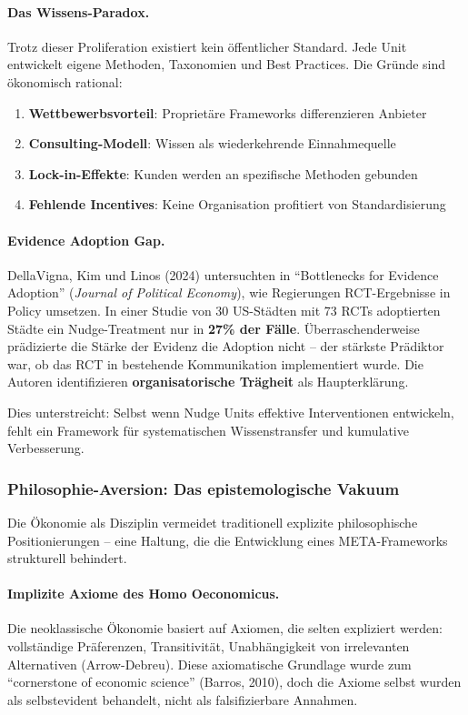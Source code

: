 \paragraph{Das Wissens-Paradox.}
Trotz dieser Proliferation existiert kein öffentlicher Standard. Jede Unit entwickelt eigene Methoden, Taxonomien und Best Practices. Die Gründe sind ökonomisch rational:

\begin{enumerate}[label=(\arabic*)]
    \item \textbf{Wettbewerbsvorteil}: Proprietäre Frameworks differenzieren Anbieter
    \item \textbf{Consulting-Modell}: Wissen als wiederkehrende Einnahmequelle
    \item \textbf{Lock-in-Effekte}: Kunden werden an spezifische Methoden gebunden
    \item \textbf{Fehlende Incentives}: Keine Organisation profitiert von Standardisierung
\end{enumerate}

\paragraph{Evidence Adoption Gap.}
DellaVigna, Kim und Linos (2024) untersuchten in ``Bottlenecks for Evidence Adoption'' (\textit{Journal of Political Economy}), wie Regierungen RCT-Ergebnisse in Policy umsetzen. In einer Studie von 30 US-Städten mit 73 RCTs adoptierten Städte ein Nudge-Treatment nur in \textbf{27\% der Fälle}. Überraschenderweise prädizierte die Stärke der Evidenz die Adoption nicht -- der stärkste Prädiktor war, ob das RCT in bestehende Kommunikation implementiert wurde. Die Autoren identifizieren \textbf{organisatorische Trägheit} als Haupterklärung.

Dies unterstreicht: Selbst wenn Nudge Units effektive Interventionen entwickeln, fehlt ein Framework für systematischen Wissenstransfer und kumulative Verbesserung.

\subsubsection{Philosophie-Aversion: Das epistemologische Vakuum}

Die Ökonomie als Disziplin vermeidet traditionell explizite philosophische Positionierungen -- eine Haltung, die die Entwicklung eines META-Frameworks strukturell behindert.

\paragraph{Implizite Axiome des Homo Oeconomicus.}
Die neoklassische Ökonomie basiert auf Axiomen, die selten expliziert werden: vollständige Präferenzen, Transitivität, Unabhängigkeit von irrelevanten Alternativen (Arrow-Debreu). Diese axiomatische Grundlage wurde zum ``cornerstone of economic science'' (Barros, 2010), doch die Axiome selbst wurden als selbstevident behandelt, nicht als falsifizierbare Annahmen.

